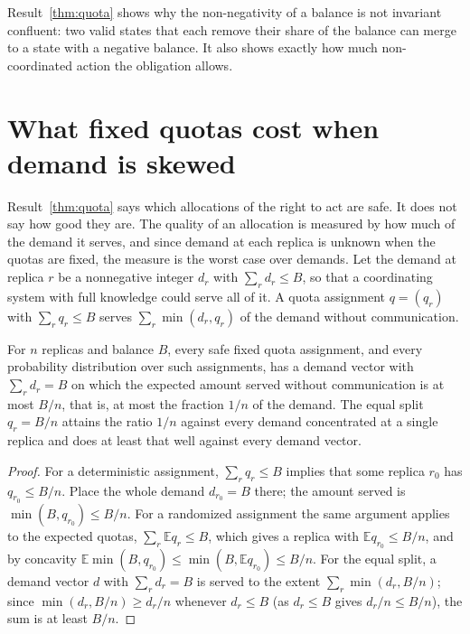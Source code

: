 Result~\ref{thm:quota} shows why the non-negativity of a balance is not invariant confluent: two valid states that each remove their share of the balance can merge to a state with a negative balance. It also shows exactly how much non-coordinated action the obligation allows.


\section{What fixed quotas cost when demand is skewed}\label{sec:quota-cost}

Result~\ref{thm:quota} says which allocations of the right to act are safe. It does not say how good they are. The quality of an allocation is measured by how much of the demand it serves, and since demand at each replica is unknown when the quotas are fixed, the measure is the worst case over demands. Let the demand at replica $r$ be a nonnegative integer $d_r$ with $\sum_rd_r\le B$, so that a coordinating system with full knowledge could serve all of it. A quota assignment $q=(q_r)$ with $\sum_rq_r\le B$ serves $\sum_r\min(d_r,q_r)$ of the demand without communication.

\begin{newresult}\label{prop:quota-ratio}
For $n$ replicas and balance $B$, every safe fixed quota assignment, and every probability distribution over such assignments, has a demand vector with $\sum_rd_r=B$ on which the expected amount served without communication is at most $B/n$, that is, at most the fraction $1/n$ of the demand. The equal split $q_r=B/n$ attains the ratio $1/n$ against every demand concentrated at a single replica and does at least that well against every demand vector.
\end{newresult}
\begin{proof}
For a deterministic assignment, $\sum_rq_r\le B$ implies that some replica $r_0$ has $q_{r_0}\le B/n$. Place the whole demand $d_{r_0}=B$ there; the amount served is $\min(B,q_{r_0})\le B/n$. For a randomized assignment the same argument applies to the expected quotas, $\sum_r\mathbb E q_r\le B$, which gives a replica with $\mathbb E q_{r_0}\le B/n$, and by concavity $\mathbb E\min(B,q_{r_0})\le\min(B,\mathbb E q_{r_0})\le B/n$. For the equal split, a demand vector $d$ with $\sum_rd_r=B$ is served to the extent $\sum_r\min(d_r,B/n)$; since $\min(d_r,B/n)\ge d_r/n$ whenever $d_r\le B$ (as $d_r\le B$ gives $d_r/n\le B/n$), the sum is at least $B/n$.
\end{proof}

